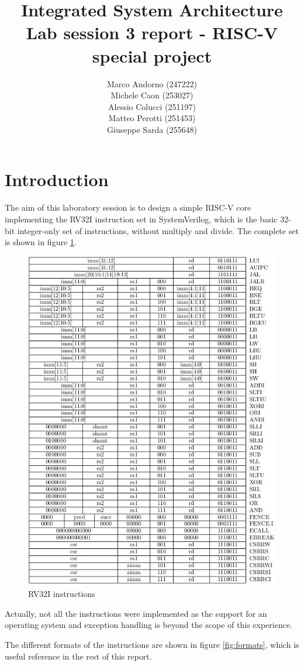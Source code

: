 \documentclass[a4paper]{article}
\title{Integrated System Architecture \\ Lab session 3 report - RISC-V special project}
\author{Marco Andorno (247222)\\ Michele Caon (253027) \\ Alessio Colucci (251197) \\ Matteo Perotti (251453) \\ Giuseppe Sarda (255648)}
\begin{document}
\maketitle
\tableofcontents

\section{Introduction}
The aim of this laboratory session is to design a simple RISC-V core implementing the RV32I instruction set in SystemVerilog, which is the basic 32-bit integer-only set of instructions, without multiply and divide. The complete set is shown in figure \ref{fig:rv32i}.

\begin{figure}[hbtp]
    \centering
    \includegraphics[width=.8\textwidth]{img/RISCV_RV32I_instr2.jpg}
    \caption{RV32I instructions}
    \label{fig:rv32i}
\end{figure}

Actually, not all the instructions were implemented as the support for an operating system and exception handling is beyond the scope of this experience.

The different formats of the instructions are shown in figure \ref{fig:formats}, which is useful reference in the rest of this report.
\end{document}
